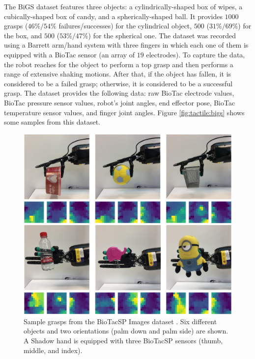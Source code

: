 The \ac{BiGS} dataset \cite{Su2015b} features three objects: a cylindrically-shaped box of wipes, a cubically-shaped box of candy, and a spherically-shaped ball. It provides $1000$ grasps ($46\%/54\%$ failures/successes) for the cylindrical object, $500$ ($31\%/69\%$) for the box, and $500$ ($53\%/47\%$) for the spherical one. The dataset was recorded using a Barrett arm/hand system with three fingers in which each one of them is equipped with a BioTac sensor (an array of $19$ electrodes). To capture the data, the robot reaches for the object to perform a top grasp and then performs a range of extensive shaking motions. After that, if the object has fallen, it is considered to be a failed grasp; otherwise, it is considered to be a successful grasp. The dataset provides the following data: raw BioTac electrode values, BioTac pressure sensor values, robot's joint angles, end effector pose, BioTac temperature sensor values, and finger joint angles. Figure \ref{fig:tactile:bigs} shows some samples from this dataset.

\begin{figure}[!htb]
    \centering
    \includegraphics[width=\linewidth]{Figures/Tactile/biotacspimages}
    \caption{Sample grasps from the BioTacSP Images dataset \cite{Zapata2018}. Six different objects and two orientations (palm down and palm side) are shown. A Shadow hand is equipped with three BioTacSP sensors (thumb, middle, and index).}
    \label{fig:tactile:biotacspimages}
\end{figure}

